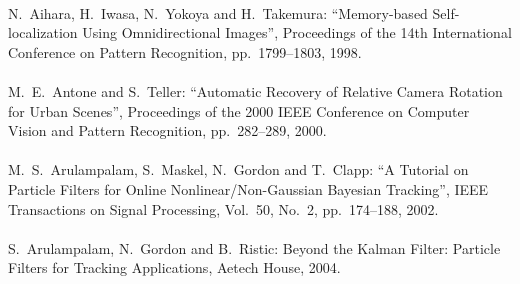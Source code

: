 \begin{mythebibliography}{}
\leavevmode \\N.~Aihara, H.~Iwasa, N.~Yokoya and H.~Takemura:
\newblock ``Memory-based Self-localization Using Omnidirectional Images'',
\newblock Proceedings of the 14th International Conference on Pattern Recognition, pp.~1799--1803, 1998.
\\



\leavevmode \\M.~E.~Antone and S.~Teller:
\newblock ``Automatic Recovery of Relative Camera Rotation for Urban Scenes'',
\newblock Proceedings of the 2000 IEEE Conference on Computer Vision and Pattern Recognition, pp.~282--289, 2000.
\\

\leavevmode \\M.~S.~Arulampalam, S.~Maskel, N.~Gordon and T.~Clapp:
\newblock ``A Tutorial on Particle Filters for Online Nonlinear/Non-Gaussian Bayesian Tracking'',
\newblock IEEE Transactions on Signal Processing, Vol.~50, No.~2, pp.~174--188, 2002.
\\

\leavevmode \\S.~Arulampalam, N.~Gordon and B.~Ristic:
\newblock Beyond the Kalman Filter: Particle Filters for Tracking Applications,
\newblock Aetech House, 2004.
\\



\end{mythebibliography}
